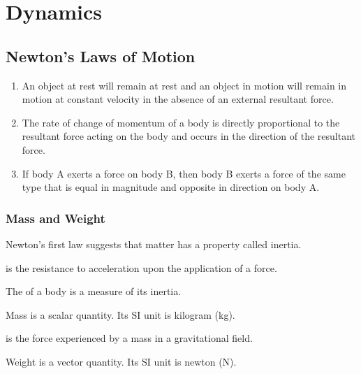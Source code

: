 \chapter{Dynamics}

\section{Newton's Laws of Motion}

\begin{law}
    \phantom{.}
    \begin{enumerate}
        \item An object at rest will remain at rest and an object in motion will remain in motion at constant velocity in the absence of an external resultant force.
        \item The rate of change of momentum of a body is directly proportional to the resultant force acting on the body and occurs in the direction of the resultant force.
        \item If body A exerts a force on body B, then body B exerts a force of the same type that is equal in magnitude and opposite in direction on body A.
    \end{enumerate}
\end{law}

\subsection{Mass and Weight}

Newton's first law suggests that matter has a property called inertia.

\begin{definition}
     is the resistance to acceleration upon the application of a force.
\end{definition}

\begin{definition}
    The  of a body is a measure of its inertia.
\end{definition}

Mass is a scalar quantity. Its SI unit is kilogram (kg).

\begin{definition}
     is the force experienced by a mass in a gravitational field.
\end{definition}

Weight is a vector quantity. Its SI unit is newton (N).

